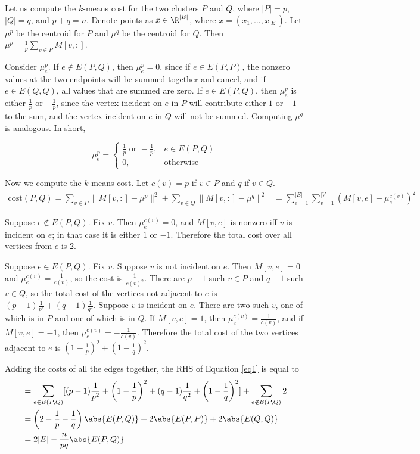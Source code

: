 Let us compute the $k$-means cost for the two clusters $P$ and $Q$, where $|P|=p$, $|Q|=q$, and $p+q=n$. Denote points as $x\in \R^{|E|}$, where $x=(x_1,\dots,x_{|E|})$. Let $\mu^p$ be the centroid for $P$ and $\mu^q$ be the centroid for $Q$. Then $\mu^p=\frac{1}{p}\sum_{v\in P}M[v,:]$.

Consider $\mu^p_e$. If $e\not\in E(P,Q)$, then $\mu^p_e=0$, since if $e\in E(P,P)$, the nonzero values at the two endpoints will be summed together and cancel, and if $e\in E(Q,Q)$, all values that are summed are zero. If $e\in E(P,Q)$, then $\mu^p_e$ is either $\frac{1}{p}$ or $-\frac{1}{p}$, since the vertex incident on $e$ in $P$ will contribute either $1$ or $-1$ to the sum, and the vertex incident on $e$ in $Q$ will not be summed. Computing $\mu^q$ is analogous. In short,

\begin{equation*}
    \mu_e^p=\begin{cases}\frac{1}{p}\text{ or }-\frac{1}{p},&e\in E(P,Q)\\
                         0,&\text{otherwise}
            \end{cases}
\end{equation*}

Now we compute the $k$-means cost. Let $c(v)=p$ if $v\in P$ and $q$ if $v\in Q$.
\begin{align}\label{eq1}
    \text{cost}(P,Q)=\sum_{v\in P}\|M[v,:]-\mu^p\|^2+\sum_{v\in Q}\|M[v,:]-\mu^q\|^2 &= \sum_{e=1}^{|E|}\sum_{v=1}^{|V|}(M[v,e]-\mu_e^{c(v)})^2
\end{align}

Suppose $e\not\in E(P,Q)$. Fix $v$. Then $\mu_e^{c(v)}=0$, and $M[v,e]$ is nonzero iff $v$ is incident on $e$; in that case it is either $1$ or $-1$. Therefore the total cost over all vertices from $e$ is 2.

Suppose $e\in E(P,Q)$. Fix $v$. Suppose $v$ is not incident on $e$. Then $M[v,e]=0$ and $\mu^{c(v)}_e=\frac{1}{c(v)}$, so the cost is $\frac{1}{c(v)^2}$. There are $p-1$ such $v\in P$ and $q-1$ such $v\in Q$, so the total cost of the vertices not adjacent to $e$ is $(p-1)\frac{1}{p^2}+(q-1)\frac{1}{q^2}$. Suppose $v$ is incident on $e$. There are two such $v$, one of which is in $P$ and one of which is in $Q$. If $M[v,e]=1$, then $\mu^{c(v)}_e=\frac{1}{c(v)}$, and if $M[v,e]=-1$, then $\mu^{c(v)}_e=-\frac{1}{c(v)}$. Therefore the total cost of the two vertices adjacent to $e$ is $(1-\frac{1}{p})^2+(1-\frac{1}{q})^2$.

Adding the costs of all the edges together, the RHS of Equation \eqref{eq1} is equal to
\begin{align}
    &= \sum_{e\in E(P,Q)}[(p-1)\frac{1}{p^2}+\left(1-\frac{1}{p}\right)^2+(q-1)\frac{1}{q^2}+\left(1-\frac{1}{q}\right)^2] + \sum_{e\not\in E(P,Q)}2 \\
    &= \left(2-\frac{1}{p}-\frac{1}{q}\right)\abs{E(P,Q)}+2\abs{E(P,P)}+2\abs{E(Q,Q)} \\
    &= 2|E| - \frac{n}{pq}\abs{E(P,Q)}
\end{align}

